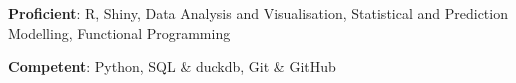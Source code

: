 \textbf{Proficient}: R, Shiny, Data Analysis and Visualisation, Statistical and Prediction Modelling, Functional Programming

\textbf{Competent}: Python, SQL \& duckdb, Git \& GitHub
